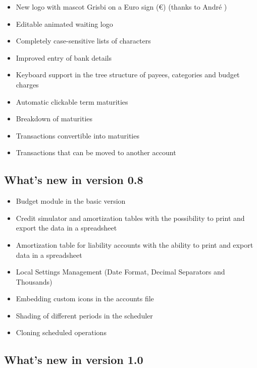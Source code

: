 \begin{itemize}
	\item New logo with mascot Grisbi on a Euro sign (€) (thanks to André )
	\item Editable animated waiting logo
	\item Completely case-sensitive lists of characters
	\item Improved entry of bank details
	\item Keyboard support in the tree structure of payees, categories and budget charges
	\item Automatic clickable term maturities
	\item Breakdown of maturities
	\item Transactions convertible into maturities
	\item Transactions that can be moved to another account
\end{itemize}

\subsection{What's new in version 0.8}

\begin{itemize}
	\item Budget module in the basic version
	\item Credit simulator and amortization tables with the possibility to print and export the data in a spreadsheet
	\item Amortization table for liability accounts with the ability to print and export data in a spreadsheet
	\item Local Settings Management (Date Format, Decimal Separators and Thousands)
	\item Embedding custom icons in the accounts file
	\item Shading of different periods in the scheduler
	\item Cloning scheduled operations
\end{itemize}

\subsection{What's new in version 1.0}

